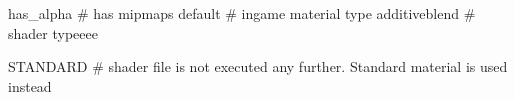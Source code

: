 has_alpha
# has mipmaps
default			 # ingame material type
additiveblend		 # shader typeeee



STANDARD     # shader file is not executed any further. Standard material is used instead
